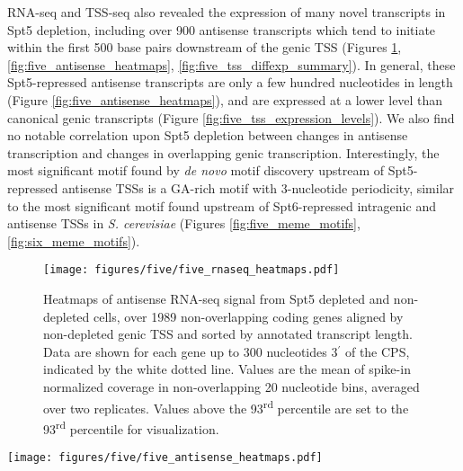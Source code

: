 RNA-seq and TSS-seq also revealed the expression of many novel transcripts in Spt5 depletion, including over 900 antisense transcripts which tend to initiate within the first 500 base pairs downstream of the genic TSS (Figures \ref{fig:five_rnaseq_heatmaps}, \ref{fig:five_antisense_heatmaps}, \ref{fig:five_tss_diffexp_summary}).
In general, these Spt5-repressed antisense transcripts are only a few hundred nucleotides in length (Figure \ref{fig:five_antisense_heatmaps}), and are expressed at a lower level than canonical genic transcripts (Figure \ref{fig:five_tss_expression_levels}).
We also find no notable correlation upon Spt5 depletion between changes in antisense transcription and changes in overlapping genic transcription.
Interestingly, the most significant motif found by \textit{de novo} motif discovery upstream of Spt5-repressed antisense TSSs is a GA-rich motif with 3-nucleotide periodicity, similar to the most significant motif found upstream of Spt6-repressed intragenic and antisense TSSs in \textit{S. cerevisiae} (Figures \ref{fig:five_meme_motifs}, \ref{fig:six_meme_motifs}).
\begin{figure}[h]
    \centering
    \texttt{[image: figures/five/five\_rnaseq\_heatmaps.pdf]}
    \caption[Heatmaps of antisense RNA-seq signal from Spt5 depleted and non-depleted cells, over non-overlapping coding genes.]{Heatmaps of antisense RNA-seq signal from Spt5 depleted and non-depleted cells, over 1989 non-overlapping coding genes aligned by non-depleted genic TSS and sorted by annotated transcript length. Data are shown for each gene up to 300 nucleotides 3$^\prime$ of the CPS, indicated by the white dotted line. Values are the mean of spike-in normalized coverage in non-overlapping 20 nucleotide bins, averaged over two replicates. Values above the 93\textsuperscript{rd} percentile are set to the 93\textsuperscript{rd} percentile for visualization.}
    \label{fig:five_rnaseq_heatmaps}
\end{figure}

\clearpage

\begin{sidewaysfigure}
    \centering
    \texttt{[image: figures/five/five\_antisense\_heatmaps.pdf]}
    \caption[Heatmaps of antisense TSS-seq, RNA-seq, and NET-seq signal from Spt5 depleted and non-depleted cells, over genes with Spt5-depletion-induced antisense TSSs.]{Heatmaps of antisense TSS-seq, RNA-seq, and NET-seq signal in Spt5 non-depleted and depleted cells, over all genes overlapping an Spt5-depletion-induced antisense TSS, aligned by the sense, genic TSS and sorted by the distance from the genic TSS to the antisense TSS. Values are the mean of spike-in normalized coverage in non-overlapping 20 nt bins, over one (non-depleted NET-seq) or more experiments. Values above the 0.995 (TSS-seq), 0.98 (RNA-seq), or 0.96 (NET-seq) quantiles are set to their respective quantiles for visualization.}
    \label{fig:five_antisense_heatmaps}
\end{sidewaysfigure}

